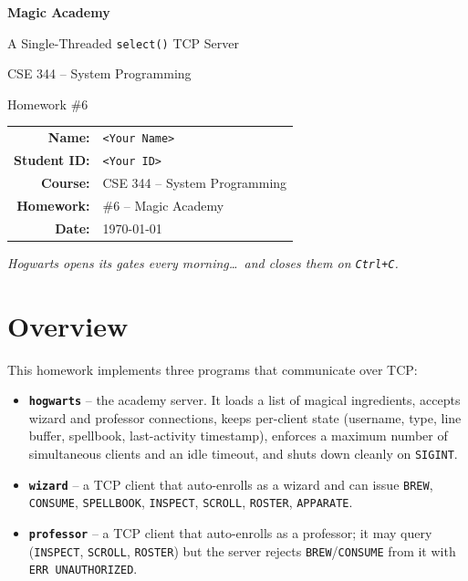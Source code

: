 \documentclass[11pt,a4paper]{article}
\newcommand{\handfont}{\itshape}
\newcommand{\handfont}{\CaveatFamily}
\newcommand{\annot}[1]{{\handfont\large\color{teal}#1}}
\begin{document}
\begin{titlepage}
\centering
\vspace*{2.5cm}
{\Huge\bfseries Magic Academy\par}
\vspace{0.4cm}
{\Large A Single-Threaded \texttt{select()} TCP Server\par}
\vspace{1.6cm}
{\large CSE 344 -- System Programming\par}
{\large Homework \#6\par}
\vspace{2.2cm}
\begin{tabular}{rl}
  \textbf{Name:}        & \texttt{<Your Name>}\\[4pt]
  \textbf{Student ID:}  & \texttt{<Your ID>}\\[4pt]
  \textbf{Course:}      & CSE 344 -- System Programming\\[4pt]
  \textbf{Homework:}    & \#6 -- Magic Academy\\[4pt]
  \textbf{Date:}        & \today\\
\end{tabular}
\vfill
\annot{Hogwarts opens its gates every morning\ldots\ and closes them on \texttt{Ctrl+C}.}
\vfill
\end{titlepage}

\tableofcontents
\newpage

\section{Overview}
This homework implements three programs that communicate over TCP:

\begin{itemize}[nosep]
  \item \textbf{\texttt{hogwarts}} -- the academy server. It loads a list of
        magical ingredients, accepts wizard and professor connections, keeps
        per-client state (username, type, line buffer, spellbook, last-activity
        timestamp), enforces a maximum number of simultaneous clients and an
        idle timeout, and shuts down cleanly on \texttt{SIGINT}.
  \item \textbf{\texttt{wizard}} -- a TCP client that auto-enrolls as a wizard
        and can issue \texttt{BREW}, \texttt{CONSUME}, \texttt{SPELLBOOK},
        \texttt{INSPECT}, \texttt{SCROLL}, \texttt{ROSTER}, \texttt{APPARATE}.
  \item \textbf{\texttt{professor}} -- a TCP client that auto-enrolls as a
        professor; it may query (\texttt{INSPECT}, \texttt{SCROLL},
        \texttt{ROSTER}) but the server rejects \texttt{BREW}/\texttt{CONSUME}
        from it with \texttt{ERR UNAUTHORIZED}.
\end{itemize}
\end{document}
